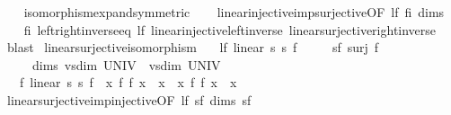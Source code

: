 \begin{isabellebody}
%
\isadelimproof
\ \ %
\endisadelimproof
%
\isatagproof
{}\isamarkupfalse%
\ isomorphism{\isacharunderscore}{\kern0pt}expand{\isacharbrackleft}{\kern0pt}symmetric{\isacharbrackright}{\kern0pt}\isanewline
\ \ \isamarkupfalse%
\ linear{\isacharunderscore}{\kern0pt}injective{\isacharunderscore}{\kern0pt}imp{\isacharunderscore}{\kern0pt}surjective{\isacharbrackleft}{\kern0pt}OF\ lf\ fi\ dims{\isacharbrackright}{\kern0pt}\isanewline
\ \ \isamarkupfalse%
\ fi\ left{\isacharunderscore}{\kern0pt}right{\isacharunderscore}{\kern0pt}inverse{\isacharunderscore}{\kern0pt}eq\ lf\ linear{\isacharunderscore}{\kern0pt}injective{\isacharunderscore}{\kern0pt}left{\isacharunderscore}{\kern0pt}inverse\ linear{\isacharunderscore}{\kern0pt}surjective{\isacharunderscore}{\kern0pt}right{\isacharunderscore}{\kern0pt}inverse\ \isamarkupfalse%
\ blast%
\endisatagproof
{\isafoldproof}%
%
\isadelimproof
\isanewline
%
\endisadelimproof
\isanewline
{}\isamarkupfalse%
\ linear{\isacharunderscore}{\kern0pt}surjective{\isacharunderscore}{\kern0pt}isomorphism{\isacharcolon}{\kern0pt}\isanewline
\ \ \ lf{\isacharcolon}{\kern0pt}\ {\isachardoublequoteopen}linear\ s{}\ s{}\ f{\isachardoublequoteclose}\isanewline
\ \ \ \ \ sf{\isacharcolon}{\kern0pt}\ {\isachardoublequoteopen}surj\ f{\isachardoublequoteclose}\isanewline
\ \ \ \ \ dims{\isacharcolon}{\kern0pt}\ {\isachardoublequoteopen}vs{}{\isachardot}{\kern0pt}dim\ UNIV\ {\isacharequal}{\kern0pt}\ vs{}{\isachardot}{\kern0pt}dim\ UNIV{\isachardoublequoteclose}\isanewline
\ \ \ {\isachardoublequoteopen}{\isasymexists}f{\isacharprime}{\kern0pt}{\isachardot}{\kern0pt}\ linear\ s{}\ s{}\ f{\isacharprime}{\kern0pt}\ {\isasymand}\ {\isacharparenleft}{\kern0pt}{\isasymforall}x{\isachardot}{\kern0pt}\ f{\isacharprime}{\kern0pt}\ {\isacharparenleft}{\kern0pt}f\ x{\isacharparenright}{\kern0pt}\ {\isacharequal}{\kern0pt}\ x{\isacharparenright}{\kern0pt}\ {\isasymand}\ {\isacharparenleft}{\kern0pt}{\isasymforall}x{\isachardot}{\kern0pt}\ f\ {\isacharparenleft}{\kern0pt}f{\isacharprime}{\kern0pt}\ x{\isacharparenright}{\kern0pt}\ {\isacharequal}{\kern0pt}\ x{\isacharparenright}{\kern0pt}{\isachardoublequoteclose}\isanewline
%
\isadelimproof
\ \ %
\endisadelimproof
%
\isatagproof
{}\isamarkupfalse%
\ linear{\isacharunderscore}{\kern0pt}surjective{\isacharunderscore}{\kern0pt}imp{\isacharunderscore}{\kern0pt}injective{\isacharbrackleft}{\kern0pt}OF\ lf\ sf\ dims{\isacharbrackright}{\kern0pt}\ sf\isanewline

\end{isabellebody}
